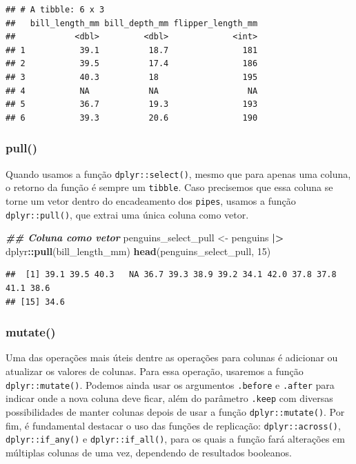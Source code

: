 \documentclass[
]{article}
\newenvironment{Shaded}{\begin{snugshade}}{\end{snugshade}}
\newcommand{\DecValTok}[1]{\textcolor[rgb]{0.00,0.00,0.81}{#1}}
\newcommand{\DocumentationTok}[1]{\textcolor[rgb]{0.56,0.35,0.01}{\textbf{\textit{#1}}}}
\newcommand{\FunctionTok}[1]{\textcolor[rgb]{0.13,0.29,0.53}{\textbf{#1}}}
\newcommand{\NormalTok}[1]{#1}
\newcommand{\OtherTok}[1]{\textcolor[rgb]{0.56,0.35,0.01}{#1}}
\newcommand{\SpecialCharTok}[1]{\textcolor[rgb]{0.81,0.36,0.00}{\textbf{#1}}}
\begin{document}
\begin{verbatim}
## # A tibble: 6 x 3
##   bill_length_mm bill_depth_mm flipper_length_mm
##            <dbl>         <dbl>             <int>
## 1           39.1          18.7               181
## 2           39.5          17.4               186
## 3           40.3          18                 195
## 4           NA            NA                  NA
## 5           36.7          19.3               193
## 6           39.3          20.6               190
\end{verbatim}

\hypertarget{pull}{%
\subsubsection{pull()}\label{pull}}

Quando usamos a função \texttt{dplyr::select()}, mesmo que para apenas uma coluna, o retorno da função é sempre um \texttt{tibble}. Caso precisemos que essa coluna se torne um vetor dentro do encadeamento dos \texttt{pipes}, usamos a função \texttt{dplyr::pull()}, que extrai uma única coluna como vetor.

\begin{Shaded}
\begin{Highlighting}[]
\DocumentationTok{\#\# Coluna como vetor}
\NormalTok{penguins\_select\_pull }\OtherTok{\textless{}{-}}\NormalTok{ penguins }\SpecialCharTok{|\textgreater{}} 
\NormalTok{    dplyr}\SpecialCharTok{::}\FunctionTok{pull}\NormalTok{(bill\_length\_mm)}
\FunctionTok{head}\NormalTok{(penguins\_select\_pull, }\DecValTok{15}\NormalTok{)}
\end{Highlighting}
\end{Shaded}

\begin{verbatim}
##  [1] 39.1 39.5 40.3   NA 36.7 39.3 38.9 39.2 34.1 42.0 37.8 37.8 41.1 38.6
## [15] 34.6
\end{verbatim}

\hypertarget{mutate}{%
\subsubsection{mutate()}\label{mutate}}

Uma das operações mais úteis dentre as operações para colunas é adicionar ou atualizar os valores de colunas. Para essa operação, usaremos a função \texttt{dplyr::mutate()}. Podemos ainda usar os argumentos \texttt{.before} e \texttt{.after} para indicar onde a nova coluna deve ficar, além do parâmetro \texttt{.keep} com diversas possibilidades de manter colunas depois de usar a função \texttt{dplyr::mutate()}. Por fim, é fundamental destacar o uso das funções de replicação: \texttt{dplyr::across()}, \texttt{dplyr::if\_any()} e \texttt{dplyr::if\_all()}, para os quais a função fará alterações em múltiplas colunas de uma vez, dependendo de resultados booleanos.
\end{document}
